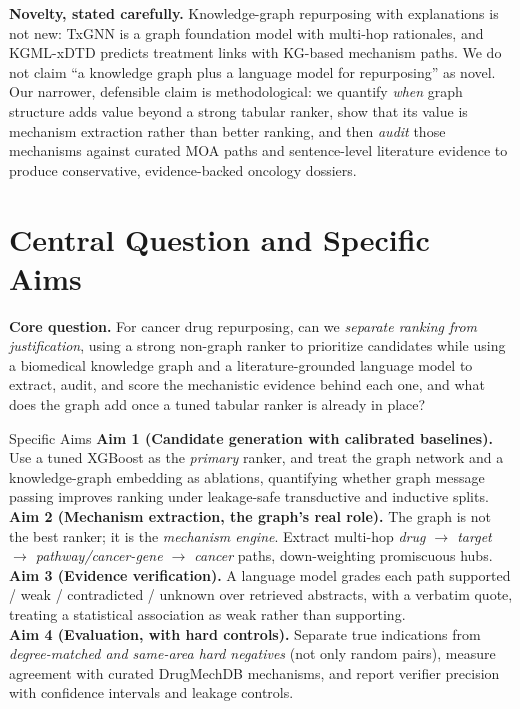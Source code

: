 \documentclass[11pt]{article}
\begin{document}
\textbf{Novelty, stated carefully.} Knowledge-graph repurposing with explanations is
not new: TxGNN is a graph foundation model with multi-hop rationales, and KGML-xDTD
predicts treatment links with KG-based mechanism paths. We do not claim ``a knowledge
graph plus a language model for repurposing'' as novel. Our narrower, defensible
claim is methodological: we quantify \emph{when} graph structure adds value beyond a
strong tabular ranker, show that its value is mechanism extraction rather than better
ranking, and then \emph{audit} those mechanisms against curated MOA paths and
sentence-level literature evidence to produce conservative, evidence-backed oncology
dossiers.

\section{Central Question and Specific Aims}

\begin{problembox}
\textbf{Core question.} For cancer drug repurposing, can we \emph{separate ranking
from justification}, using a strong non-graph ranker to prioritize candidates while
using a biomedical knowledge graph and a literature-grounded language model to
extract, audit, and score the mechanistic evidence behind each one, and what does
the graph add once a tuned tabular ranker is already in place?
\end{problembox}

\begin{aimbox}{Specific Aims}
\textbf{Aim 1 (Candidate generation with calibrated baselines).} Use a tuned
XGBoost as the \emph{primary} ranker, and treat the graph network and a
knowledge-graph embedding as ablations, quantifying whether graph message passing
improves ranking under leakage-safe transductive and inductive splits.\\
\textbf{Aim 2 (Mechanism extraction, the graph's real role).} The graph is not
the best ranker; it is the \emph{mechanism engine}. Extract multi-hop
\emph{drug $\rightarrow$ target $\rightarrow$ pathway/cancer-gene $\rightarrow$
cancer} paths, down-weighting promiscuous hubs.\\
\textbf{Aim 3 (Evidence verification).} A language model grades each path
supported / weak / contradicted / unknown over retrieved abstracts, with a verbatim
quote, treating a statistical association as weak rather than supporting.\\
\textbf{Aim 4 (Evaluation, with hard controls).} Separate true indications from
\emph{degree-matched and same-area hard negatives} (not only random pairs), measure
agreement with curated DrugMechDB mechanisms, and report verifier precision with
confidence intervals and leakage controls.
\end{aimbox}
\end{document}
